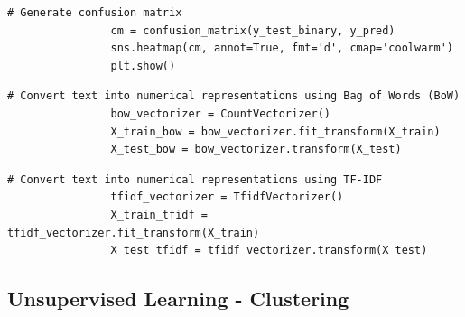             \vspace{0.5em}
            
            \begin{lstlisting}[caption={Generate confusion matrix}, label={lst:confusion_matrix}]
                # Generate confusion matrix
                cm = confusion_matrix(y_test_binary, y_pred)
                sns.heatmap(cm, annot=True, fmt='d', cmap='coolwarm')
                plt.show()
            \end{lstlisting}
            
            \vspace{0.5em}
            
            \begin{lstlisting}[caption={Convert text using Bag of Words (BoW)}, label={lst:bow_conversion}]
                # Convert text into numerical representations using Bag of Words (BoW)
                bow_vectorizer = CountVectorizer()
                X_train_bow = bow_vectorizer.fit_transform(X_train)
                X_test_bow = bow_vectorizer.transform(X_test)
            \end{lstlisting}
            
            \vspace{0.5em}
            
            \begin{lstlisting}[caption={Convert text using TF-IDF}, label={lst:tfidf_conversion}]
                # Convert text into numerical representations using TF-IDF
                tfidf_vectorizer = TfidfVectorizer()
                X_train_tfidf = tfidf_vectorizer.fit_transform(X_train)
                X_test_tfidf = tfidf_vectorizer.transform(X_test)
            \end{lstlisting}
            
            \vspace{0.5em}

        \subsection{Unsupervised Learning - Clustering}
        
            \vspace{0.5em}

